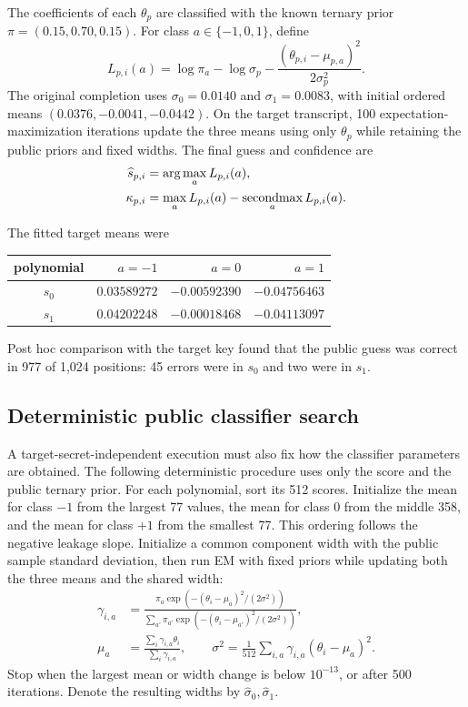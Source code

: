 \documentclass[11pt,a4paper]{article}
\begin{document}
The coefficients of each $\theta_p$ are classified with the known ternary
prior $\pi=(0.15,0.70,0.15)$.  For class $a\in\{-1,0,1\}$, define
\begin{equation}
  L_{p,i}(a)=\log\pi_a-\log\sigma_p
      -\frac{(\theta_{p,i}-\mu_{p,a})^2}{2\sigma_p^2}.
\label{eq:likelihood}
\end{equation}
The original completion uses $\sigma_0=0.0140$ and $\sigma_1=0.0083$, with
initial ordered means $(0.0376,-0.0041,-0.0442)$.  On the target transcript,
100 expectation-maximization iterations update the three means using only
$\theta_p$ while retaining the public priors and fixed widths.  The final
guess and confidence are
\begin{align}
 \widehat s_{p,i}&=\arg\max_a L_{p,i}(a),\\
 \kappa_{p,i}&=\max_a L_{p,i}(a)
                 -\mathop{\rm secondmax}_a L_{p,i}(a).
\end{align}

The fitted target means were
\begin{center}
\begin{tabular}{c@{\qquad}rrr}
\toprule
polynomial & $a=-1$ & $a=0$ & $a=1$\\
\midrule
$s_0$ & $0.03589272$ & $-0.00592390$ & $-0.04756463$\\
$s_1$ & $0.04202248$ & $-0.00018468$ & $-0.04113097$\\
\bottomrule
\end{tabular}
\end{center}
Post hoc comparison with the target key found that the public guess was
correct in 977 of 1,024 positions: 45 errors were in $s_0$ and two were in
$s_1$.

\subsection{Deterministic public classifier search}
\label{sec:public-classifier}

A target-secret-independent execution must also fix how the classifier
parameters are obtained.  The following deterministic procedure uses only
the score and the public ternary prior.  For each polynomial, sort its 512
scores.  Initialize the mean for class $-1$ from the largest 77 values, the
mean for class 0 from the middle 358, and the mean for class $+1$ from the
smallest 77.  This ordering follows the negative leakage slope.  Initialize a
common component width with the public sample standard deviation, then run EM
with fixed priors while updating both the three means and the shared width:
\begin{align}
 \gamma_{i,a}&=\frac{\pi_a
  \exp\!\left(-({\theta_i-\mu_a})^2/(2\sigma^2)\right)}
  {\sum_{a'}\pi_{a'}
  \exp\!\left(-({\theta_i-\mu_{a'}})^2/(2\sigma^2)\right)},\\
 \mu_a&=\frac{\sum_i\gamma_{i,a}\theta_i}{\sum_i\gamma_{i,a}},
 \qquad
 \sigma^2=\frac1{512}\sum_{i,a}\gamma_{i,a}(\theta_i-\mu_a)^2.
\label{eq:public-em}
\end{align}
Stop when the largest mean or width change is below $10^{-13}$, or after 500
iterations.  Denote the resulting widths by
$\widehat\sigma_0,\widehat\sigma_1$.
\end{document}
